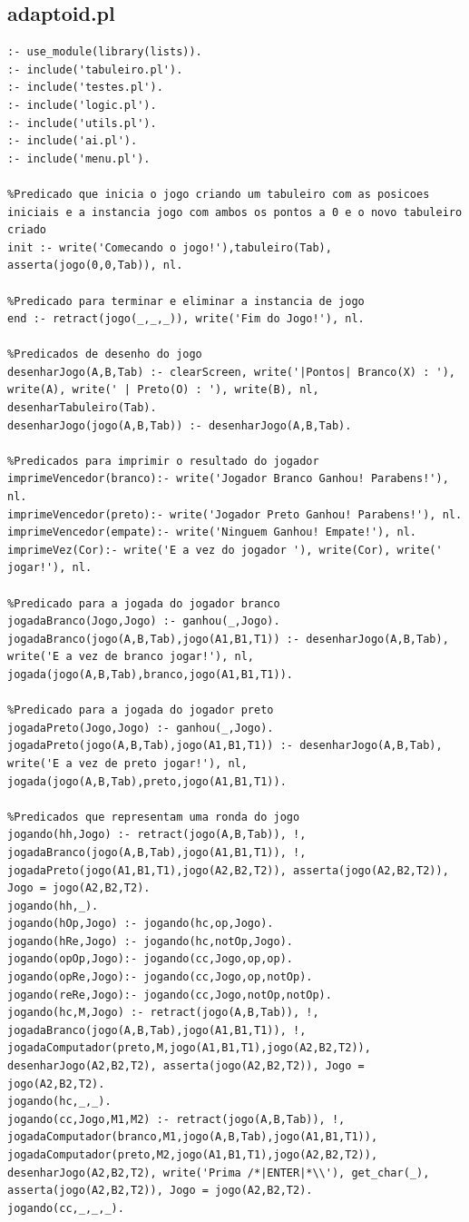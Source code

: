 \documentclass[a4paper]{article}
\begin{document}
\subsection{adaptoid.pl}
\begin{lstlisting}
:- use_module(library(lists)).
:- include('tabuleiro.pl').
:- include('testes.pl').
:- include('logic.pl').
:- include('utils.pl').
:- include('ai.pl').
:- include('menu.pl').

%Predicado que inicia o jogo criando um tabuleiro com as posicoes iniciais e a instancia jogo com ambos os pontos a 0 e o novo tabuleiro criado
init :- write('Comecando o jogo!'),tabuleiro(Tab), asserta(jogo(0,0,Tab)), nl.

%Predicado para terminar e eliminar a instancia de jogo
end :- retract(jogo(_,_,_)), write('Fim do Jogo!'), nl.

%Predicados de desenho do jogo
desenharJogo(A,B,Tab) :- clearScreen, write('|Pontos| Branco(X) : '), write(A), write(' | Preto(O) : '), write(B), nl, desenharTabuleiro(Tab).
desenharJogo(jogo(A,B,Tab)) :- desenharJogo(A,B,Tab).

%Predicados para imprimir o resultado do jogador
imprimeVencedor(branco):- write('Jogador Branco Ganhou! Parabens!'), nl.
imprimeVencedor(preto):- write('Jogador Preto Ganhou! Parabens!'), nl.
imprimeVencedor(empate):- write('Ninguem Ganhou! Empate!'), nl.
imprimeVez(Cor):- write('E a vez do jogador '), write(Cor), write(' jogar!'), nl.

%Predicado para a jogada do jogador branco
jogadaBranco(Jogo,Jogo) :- ganhou(_,Jogo).
jogadaBranco(jogo(A,B,Tab),jogo(A1,B1,T1)) :- desenharJogo(A,B,Tab), write('E a vez de branco jogar!'), nl, jogada(jogo(A,B,Tab),branco,jogo(A1,B1,T1)).

%Predicado para a jogada do jogador preto
jogadaPreto(Jogo,Jogo) :- ganhou(_,Jogo).
jogadaPreto(jogo(A,B,Tab),jogo(A1,B1,T1)) :- desenharJogo(A,B,Tab), write('E a vez de preto jogar!'), nl, jogada(jogo(A,B,Tab),preto,jogo(A1,B1,T1)).

%Predicados que representam uma ronda do jogo
jogando(hh,Jogo) :- retract(jogo(A,B,Tab)), !, jogadaBranco(jogo(A,B,Tab),jogo(A1,B1,T1)), !, jogadaPreto(jogo(A1,B1,T1),jogo(A2,B2,T2)), asserta(jogo(A2,B2,T2)), Jogo = jogo(A2,B2,T2).
jogando(hh,_).
jogando(hOp,Jogo) :- jogando(hc,op,Jogo).
jogando(hRe,Jogo) :- jogando(hc,notOp,Jogo).
jogando(opOp,Jogo):- jogando(cc,Jogo,op,op).
jogando(opRe,Jogo):- jogando(cc,Jogo,op,notOp).
jogando(reRe,Jogo):- jogando(cc,Jogo,notOp,notOp).
jogando(hc,M,Jogo) :- retract(jogo(A,B,Tab)), !, jogadaBranco(jogo(A,B,Tab),jogo(A1,B1,T1)), !, jogadaComputador(preto,M,jogo(A1,B1,T1),jogo(A2,B2,T2)), desenharJogo(A2,B2,T2), asserta(jogo(A2,B2,T2)), Jogo = jogo(A2,B2,T2).
jogando(hc,_,_).
jogando(cc,Jogo,M1,M2) :- retract(jogo(A,B,Tab)), !, jogadaComputador(branco,M1,jogo(A,B,Tab),jogo(A1,B1,T1)), jogadaComputador(preto,M2,jogo(A1,B1,T1),jogo(A2,B2,T2)), desenharJogo(A2,B2,T2), write('Prima /*|ENTER|*\\'), get_char(_), asserta(jogo(A2,B2,T2)), Jogo = jogo(A2,B2,T2).
jogando(cc,_,_,_).


\end{lstlisting}
\end{document}
